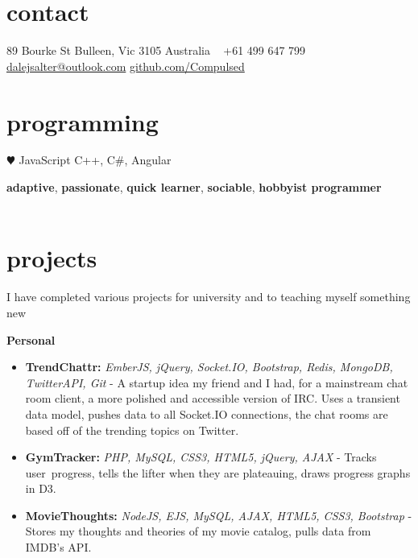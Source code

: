 \documentclass[]{friggeri-cv} %
\begin{document}

\begin{aside} %
\section{contact}
89 Bourke St
Bulleen, Vic 3105
Australia
~
+61 499 647 799
~
\href{mailto:dalejsalter@outlook.com}{dalejsalter@outlook.com}
\href{http://www.github.com/Compulsed/}{github.com/Compulsed}
\section{programming}
{\color{red} $\varheartsuit$} JavaScript
C++, C\#, Angular
\end{aside}


\textbf{adaptive}, \textbf{passionate}, \textbf{quick learner}, \textbf{sociable}, \textbf{hobbyist programmer} \\ \\

\section{projects}
I have completed various projects for university and to teaching myself something new

{
  \large\textbf{Personal}
}
\begin{itemize}
    \item \textbf{TrendChattr:} \emph{EmberJS, jQuery, Socket.IO, Bootstrap, Redis, MongoDB, TwitterAPI, Git} -
        A startup idea my friend and I had, for a mainstream chat room client, a more polished
         and accessible version of IRC.
        Uses a transient data model, pushes data to all Socket.IO connections,
        the chat rooms are based off of the trending topics on Twitter.
    \item \textbf{GymTracker:} \emph{PHP, MySQL, CSS3, HTML5, jQuery, AJAX} -
        Tracks user progress, tells the lifter when they are plateauing, draws progress graphs in D3.
    \item \textbf{MovieThoughts:} \emph{NodeJS, EJS, MySQL, AJAX, HTML5, CSS3, Bootstrap} -
        Stores my thoughts and theories of my movie catalog, pulls data from IMDB's API.
\end{itemize}
\end{document}
